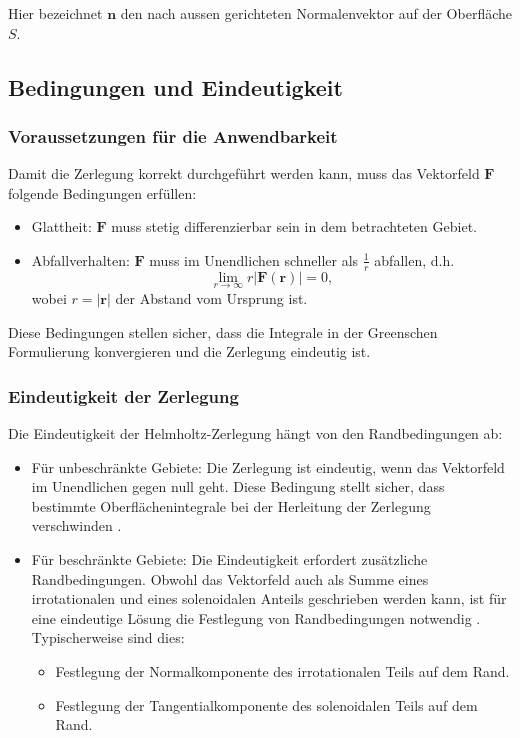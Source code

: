 \noindent Hier bezeichnet $\mathbf{n}$ den nach aussen gerichteten Normalenvektor auf der Oberfläche $S$.

\subsection{Bedingungen und Eindeutigkeit
\label{helmholtz:subsection:Bedingungen_Eindeutigkeit}}

\subsubsection{Voraussetzungen für die Anwendbarkeit}
Damit die Zerlegung korrekt durchgeführt werden kann, muss das Vektorfeld $\mathbf{F}$ folgende Bedingungen erfüllen:

\begin{itemize}
\item Glattheit: $\mathbf{F}$ muss stetig differenzierbar sein in dem betrachteten Gebiet.
\item Abfallverhalten: $\mathbf{F}$ muss im Unendlichen schneller als $\frac{1}{r}$ abfallen, d.h.
\begin{equation}
\lim_{r \to \infty} r|\mathbf{F}(\mathbf{r})| = 0,
\end{equation}
wobei $r = |\mathbf{r}|$ der Abstand vom Ursprung ist.
\end{itemize}

\noindent Diese Bedingungen stellen sicher, dass die Integrale in der Greenschen Formulierung konvergieren und die Zerlegung eindeutig ist.

\subsubsection{Eindeutigkeit der Zerlegung}

Die Eindeutigkeit der Helmholtz-Zerlegung hängt von den Randbedingungen ab:

\begin{itemize}
\item Für unbeschränkte Gebiete: Die Zerlegung ist eindeutig, wenn das Vektorfeld im Unendlichen gegen null geht. Diese Bedingung stellt sicher, dass bestimmte Oberflächenintegrale bei der Herleitung der Zerlegung verschwinden \cite{baird_helmholtz}.

\item Für beschränkte Gebiete: Die Eindeutigkeit erfordert zusätzliche Randbedingungen. Obwohl das Vektorfeld auch als Summe eines irrotationalen und eines solenoidalen Anteils geschrieben werden kann, ist für eine eindeutige Lösung die Festlegung von Randbedingungen notwendig \cite{baird_helmholtz}. Typischerweise sind dies:
  \begin{itemize}
    \item Festlegung der Normalkomponente des irrotationalen Teils auf dem Rand.
    \item Festlegung der Tangentialkomponente des solenoidalen Teils auf dem Rand.
  \end{itemize}
\end{itemize}

